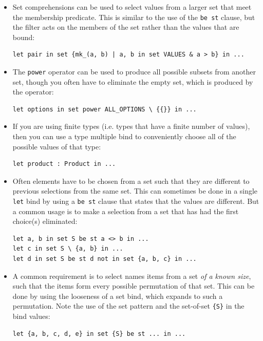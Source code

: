 \documentclass{overturerepchap}
\begin{document}
\begin{itemize}
  \item Set comprehensions can be used to select values from a larger set that
  meet the membership predicate. This is similar to the use of the \texttt{be
  st} clause, but the filter acts on the members of the set rather than the
  values that are bound:
\small
\begin{lstlisting}
let pair in set {mk_(a, b) | a, b in set VALUES & a > b} in ...
\end{lstlisting}
\normalsize
  \item The \texttt{power} operator can be used to produce all possible subsets
  from another set, though you often have to eliminate the empty set, which is
  produced by the operator:
\small
\begin{lstlisting}
let options in set power ALL_OPTIONS \ {{}} in ...
\end{lstlisting}
\normalsize
  \item If you are using finite types (i.e. types that have a finite number of
  values), then you can use a type multiple bind to conveniently choose all of
  the possible values of that type:
\small
\begin{lstlisting}
let product : Product in ...
\end{lstlisting}
\normalsize
  \item Often elements have to be chosen from a set such that they are different
  to previous selections from the same set. This can sometimes be done in a
  single \texttt{let} bind by using a \texttt{be st} clause that states that the
  values are different. But a common usage is to make a selection from a set
  that has had the first choice(s) eliminated:
\small
\begin{lstlisting}
let a, b in set S be st a <> b in ...
let c in set S \ {a, b} in ...
let d in set S be st d not in set {a, b, c} in ...
\end{lstlisting}
\normalsize
  \item A common requirement is to select names items from a set \emph{of a
  known size}, such that the items form every possible permutation of that set.
  This can be done by using the looseness of a set bind, which expands to such a
  permutation. Note the use of the set pattern and the set-of-set
  \texttt{\{S\}} in the bind values:
\small
\begin{lstlisting}
let {a, b, c, d, e} in set {S} be st ... in ...
\end{lstlisting}
\normalsize
\end{itemize}
\end{document}
